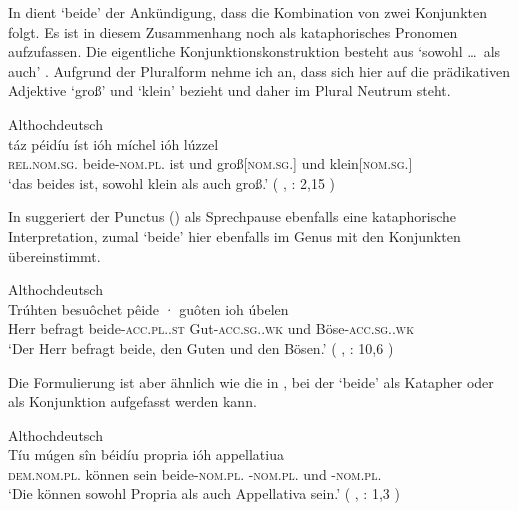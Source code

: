 
In  dient  `beide' der Ankündigung, dass die
Kombination von zwei Konjunkten folgt. Es ist in diesem Zusammenhang noch als
kataphorisches Pronomen aufzufassen. Die eigentliche
Konjunktionskonstruktion besteht aus  `sowohl \dots\ als
auch' \autocite[vgl.][169]{schuetzeichel2012}. Aufgrund der Pluralform nehme
ich an, dass  sich hier auf die prädikativen
Adjektive  `groß' und  `klein'
bezieht und daher im Plural Neutrum steht.

\begin{exe}
\ex \label{ex:beidejohahd_1}
	\langinfo%
		{Althochdeutsch}%
		{}%
		{\cite[nach][57]{king1972}}\\
\gll táz péidíu íst ióh míchel ióh lúzzel \\
	\textsc{rel.nom.sg.\NeutI} beide-\textsc{nom.pl.\NeutI} ist und
	groß[\textsc{nom.sg.\NeutI}] und klein[\textsc{nom.sg.\NeutI}] \\
\trans `das beides ist, sowohl klein als auch groß.'
	(%
		, : 2,15%
	)
\end{exe}

In  suggeriert der Punctus () als Sprechpause
ebenfalls eine kataphorische Interpretation, zumal 
`beide' hier ebenfalls im Genus mit den Konjunkten
übereinstimmt.

\begin{exe}
\ex \label{ex:beidejohahd_2}
	\langinfo%
		{Althochdeutsch}%
		{}%
		{\cite[nach][35]{tax1979}}\\
	\gll Trúhten besuôchet pêide · guôten ioh úbelen \\
		Herr befragt beide-\textsc{acc.pl.\MascA.st} {}
			Gut-\textsc{acc.sg.\MascA.wk} und
			Böse-\textsc{acc.sg.\MascA.wk} \\
	\trans `Der Herr befragt beide, den Guten und den Bösen.'
		(%
			, : 10,6%
		)
\end{exe}

Die Formulierung ist aber ähnlich wie die in , bei der
 `beide' als Katapher oder als Konjunktion aufgefasst
werden kann.

\begin{exe}
\ex \label{ex:beidejohahd_3}
	\langinfo%
		{Althochdeutsch}%
		{}%
		{\cite[nach][6]{king1972}}\\
	\gll Tíu múgen sîn béidíu propria ióh appellatiua \\
		\textsc{dem.nom.pl.\NeutI} können sein beide-\textsc{nom.pl.\NeutI}
			-\textsc{nom.pl.\NeutI} und
			-\textsc{nom.pl.\NeutI} \\
	\trans `Die können sowohl Propria als auch Appellativa sein.'
		(%
			, : 1,3%
		)
\end{exe}

